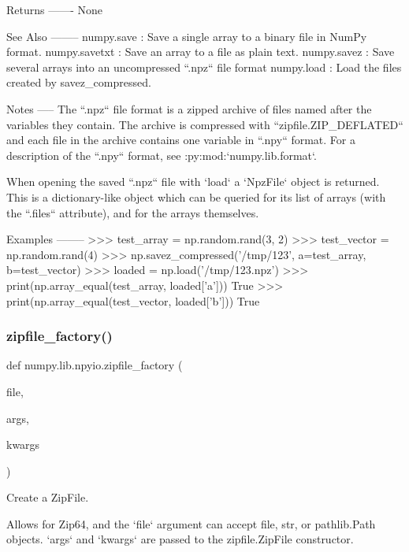 \begin{DoxyVerb}
\begin{DoxyVerb}
Returns
-------
None

See Also
--------
numpy.save : Save a single array to a binary file in NumPy format.
numpy.savetxt : Save an array to a file as plain text.
numpy.savez : Save several arrays into an uncompressed ``.npz`` file format
numpy.load : Load the files created by savez_compressed.

Notes
-----
The ``.npz`` file format is a zipped archive of files named after the
variables they contain.  The archive is compressed with
``zipfile.ZIP_DEFLATED`` and each file in the archive contains one variable
in ``.npy`` format. For a description of the ``.npy`` format, see
:py:mod:`numpy.lib.format`.


When opening the saved ``.npz`` file with `load` a `NpzFile` object is
returned. This is a dictionary-like object which can be queried for
its list of arrays (with the ``.files`` attribute), and for the arrays
themselves.

Examples
--------
>>> test_array = np.random.rand(3, 2)
>>> test_vector = np.random.rand(4)
>>> np.savez_compressed('/tmp/123', a=test_array, b=test_vector)
>>> loaded = np.load('/tmp/123.npz')
>>> print(np.array_equal(test_array, loaded['a']))
True
>>> print(np.array_equal(test_vector, loaded['b']))
True\end{DoxyVerb}
 \mbox{\label{namespacenumpy_1_1lib_1_1npyio_a4e45fbe51a28a82220e9628a8b041e24}} 
\subsubsection{\texorpdfstring{zipfile\+\_\+factory()}{zipfile\_factory()}}
{\footnotesize\ttfamily def numpy.\+lib.\+npyio.\+zipfile\+\_\+factory (\begin{DoxyParamCaption}\item[{}]{file,  }\item[{}]{args,  }\item[{}]{kwargs }\end{DoxyParamCaption})}

\begin{DoxyVerb}Create a ZipFile.

Allows for Zip64, and the `file` argument can accept file, str, or
pathlib.Path objects. `args` and `kwargs` are passed to the zipfile.ZipFile
constructor.
\end{DoxyVerb}
 


\end{DoxyVerb}
